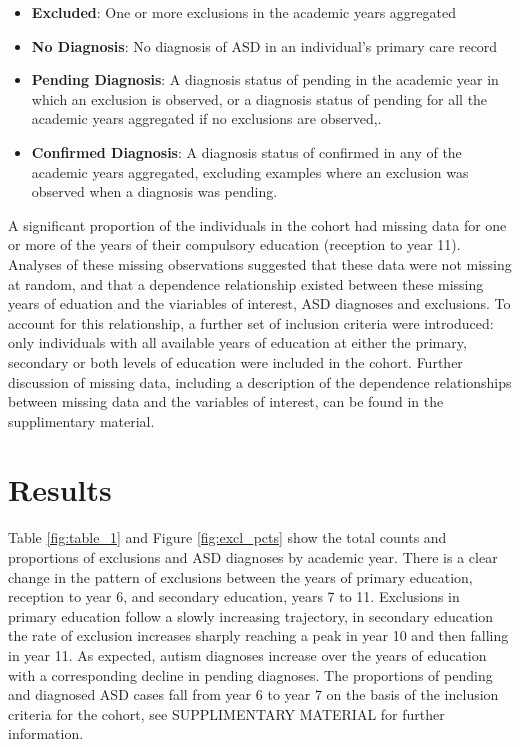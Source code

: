 \documentclass[
]{article}
\providecommand{\tightlist}{%
  \setlength{\itemsep}{0pt}\setlength{\parskip}{0pt}}
\begin{document}
\begin{itemize}
\tightlist
\item
  \textbf{Excluded}: One or more exclusions in the academic years
  aggregated
\item
  \textbf{No Diagnosis}: No diagnosis of ASD in an individual's primary
  care record
\item
  \textbf{Pending Diagnosis}: A diagnosis status of pending in the
  academic year in which an exclusion is observed, or a diagnosis status
  of pending for all the academic years aggregated if no exclusions are
  observed,.
\item
  \textbf{Confirmed Diagnosis}: A diagnosis status of confirmed in any
  of the academic years aggregated, excluding examples where an
  exclusion was observed when a diagnosis was pending.
\end{itemize}

A significant proportion of the individuals in the cohort had missing
data for one or more of the years of their compulsory education
(reception to year 11). Analyses of these missing observations suggested
that these data were not missing at random, and that a dependence
relationship existed between these missing years of eduation and the
viariables of interest, ASD diagnoses and exclusions. To account for
this relationship, a further set of inclusion criteria were introduced:
only individuals with all available years of education at either the
primary, secondary or both levels of education were included in the
cohort. Further discussion of missing data, including a description of
the dependence relationships between missing data and the variables of
interest, can be found in the supplimentary material.

\hypertarget{results}{%
\section{Results}\label{results}}

Table \ref{fig:table_1} and Figure \ref{fig:excl_pcts} show the total
counts and proportions of exclusions and ASD diagnoses by academic year.
There is a clear change in the pattern of exclusions between the years
of primary education, reception to year 6, and secondary education,
years 7 to 11. Exclusions in primary education follow a slowly
increasing trajectory, in secondary education the rate of exclusion
increases sharply reaching a peak in year 10 and then falling in year
11. As expected, autism diagnoses increase over the years of education
with a corresponding decline in pending diagnoses. The proportions of
pending and diagnosed ASD cases fall from year 6 to year 7 on the basis
of the inclusion criteria for the cohort, see SUPPLIMENTARY MATERIAL for
further information.
\end{document}
